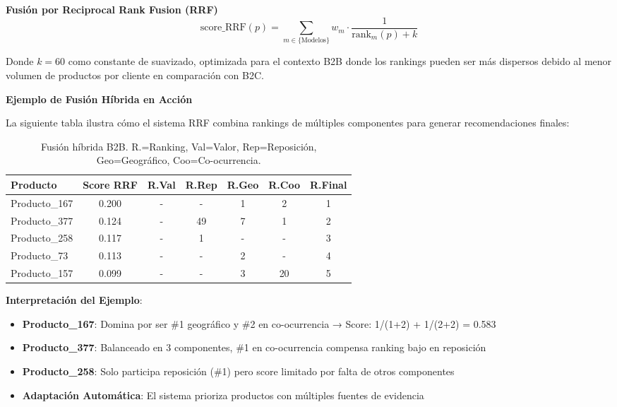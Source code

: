 \documentclass[twocolumn]{article}
\begin{document}
\textbf{Fusión por Reciprocal Rank Fusion (RRF)}
\begin{equation}
\text{score\_RRF}(p) = \sum_{m \in \{\text{Modelos}\}} w_m \cdot \frac{1}{\text{rank}_m(p) + k}
\end{equation}

Donde \(k = 60\) como constante de suavizado, optimizada para el contexto B2B donde los rankings pueden ser más dispersos debido al menor volumen de productos por cliente en comparación con B2C.

\textbf{Ejemplo de Fusión Híbrida en Acción}

La siguiente tabla ilustra cómo el sistema RRF combina rankings de múltiples componentes para generar recomendaciones finales:

\begin{table}[H]
\centering
\small
\setlength{\tabcolsep}{4pt}
\begin{tabular}{|l|c|c|c|c|c|c|}
\hline
\textbf{Producto} & \textbf{Score RRF} & \textbf{R.Val} & \textbf{R.Rep} & \textbf{R.Geo} & \textbf{R.Coo} & \textbf{R.Final} \\
\hline
Producto\_167 & 0.200 & - & - & 1 & 2 & 1 \\
\hline
Producto\_377 & 0.124 & - & 49 & 7 & 1 & 2 \\
\hline
Producto\_258 & 0.117 & - & 1 & - & - & 3 \\
\hline
Producto\_73 & 0.113 & - & - & 2 & - & 4 \\
\hline
Producto\_157 & 0.099 & - & - & 3 & 20 & 5 \\
\hline
\end{tabular}
\caption{Fusión híbrida B2B. R.=Ranking, Val=Valor, Rep=Reposición, Geo=Geográfico, Coo=Co-ocurrencia.}
\end{table}

\textbf{Interpretación del Ejemplo}:
\begin{itemize}
    \item \textbf{Producto\_167}: Domina por ser \#1 geográfico y \#2 en co-ocurrencia → Score: 1/(1+2) + 1/(2+2) = 0.583
    \item \textbf{Producto\_377}: Balanceado en 3 componentes, \#1 en co-ocurrencia compensa ranking bajo en reposición
    \item \textbf{Producto\_258}: Solo participa reposición (\#1) pero score limitado por falta de otros componentes
    \item \textbf{Adaptación Automática}: El sistema prioriza productos con múltiples fuentes de evidencia
\end{itemize}
\end{document}
